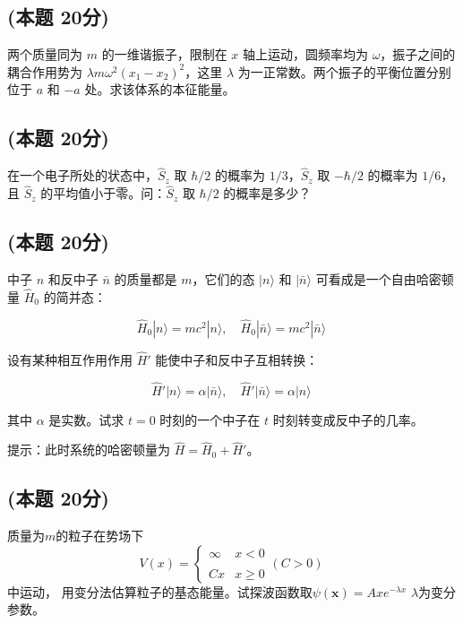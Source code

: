 \subsection{(本题 20分)}
两个质量同为 $m$ 的一维谐振子，限制在 $x$ 轴上运动，圆频率均为 $\omega$，振子之间的耦合作用势为 $\lambda m \omega^2 (x_1 - x_2)^2$，这里 $\lambda$ 为一正常数。两个振子的平衡位置分别位于 $a$ 和 $-a$ 处。求该体系的本征能量。
\subsection{(本题 20分)}
在一个电子所处的状态中，$\hat S_z$ 取 $\hbar/2$ 的概率为 $1/3$，$\hat S_z$ 取 $-\hbar/2$ 的概率为 $1/6$，且 $\hat S_z$ 的平均值小于零。问：$\hat S_z$ 取 $\hbar/2$ 的概率是多少？
\subsection{(本题 20分)}
中子 $n$ 和反中子 $\bar{n}$ 的质量都是 $m$，它们的态 $|n\rangle$ 和 $|\bar{n}\rangle$ 可看成是一个自由哈密顿量 $\hat H_0$ 的简并态：

$$\hat H_0|n\rangle = mc^2|n\rangle, \quad \hat H_0|\bar{n}\rangle = mc^2|\bar{n}\rangle~$$

设有某种相互作用作用 $\hat H'$ 能使中子和反中子互相转换：

$$\hat H'|n\rangle = \alpha|\bar{n}\rangle, \quad \hat H'|\bar{n}\rangle = \alpha|n\rangle~$$

其中 $\alpha$ 是实数。试求 $t=0$ 时刻的一个中子在 $t$ 时刻转变成反中子的几率。

提示：此时系统的哈密顿量为 $\hat{H} = \hat{H}_0 + \hat{H}'$。
\subsection{(本题 20分)}
质量为$m$的粒子在势场下$$V(x) = \begin{cases} \infty & x < 0 \\\\ Cx & x \geq 0\end{cases}(C>0)~$$中运动，
用变分法估算粒子的基态能量。试探波函数取$\psi(\mathbf{x}) = A x e^{-\lambda x}$ $\lambda$为变分参数。


